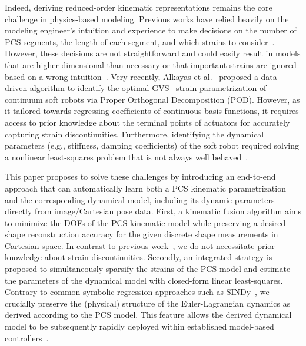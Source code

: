 %
Indeed, deriving reduced-order kinematic representations remains the core challenge in physics-based modeling. 
%
Previous works have relied heavily on the modeling engineer's intuition and experience to make decisions on the number of \gls{PCS} segments, the length of each segment, and which strains to consider~\cite{toshimitsu2021sopra}. However, these decisions are not straightforward and could easily result in models that are higher-dimensional than necessary or that important strains are ignored based on a wrong intuition~\cite{garg2022kinematic}.
Very recently, Alkayas et al.~\cite{alkayas2025soft} proposed a data-driven algorithm to identify the optimal \gls{GVS}~\cite{boyer2020dynamics} strain parametrization of continuum soft robots via Proper Orthogonal Decomposition (POD). However, as it tailored towards regressing coefficients of continuous basis functions, it requires access to prior knowledge about the terminal points of actuators for accurately capturing strain discontinuities.
Furthermore, identifying the dynamical parameters (e.g., stiffness, damping coefficients) of the soft robot required solving a nonlinear least-squares problem that is not always well behaved~\cite{stolzle2024experimental}.

This paper proposes to solve these challenges by introducing an end-to-end approach that can automatically learn both a \gls{PCS} kinematic parametrization and the corresponding dynamical model, including its dynamic parameters directly from image/Cartesian pose data.
First, a kinematic fusion algorithm aims to minimize the \glspl{DOF} of the \gls{PCS} kinematic model while preserving a desired shape reconstruction accuracy for the given discrete shape measurements in Cartesian space. In contrast to previous work~\cite{alkayas2025soft}, we do not necessitate prior knowledge about strain discontinuities.
Secondly, an integrated strategy is proposed to simultaneously sparsify the strains of the \gls{PCS} model and estimate the parameters of the dynamical model with closed-form linear least-squares.
Contrary to common symbolic regression approaches such as SINDy~\cite{kaiser2018sparse}, we crucially preserve the (physical) structure of the Euler-Lagrangian dynamics as derived according to the \gls{PCS} model.
This feature allows the derived dynamical model to be subsequently rapidly deployed within established model-based controllers~\cite{della2023model}.


